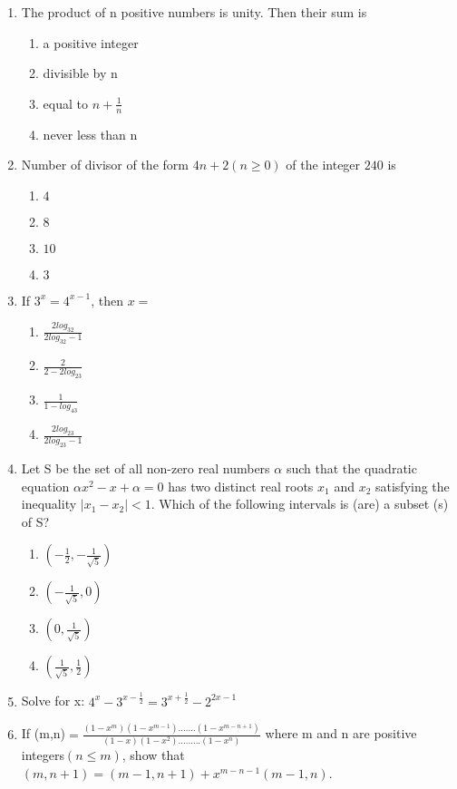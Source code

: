 \documentclass[journal,12pt,twocolumn]{IEEEtran}
\begin{document}
\begin{enumerate}[label=\arabic*]
\item The product of n positive numbers is unity. Then their sum is
\begin{enumerate}
\item a positive integer
\item divisible by n
\item equal to $n+\frac{1}{n}$
\item never less than n
\end{enumerate}

\item Number of divisor of the form $4n+2(n\geq0)$ of the integer $240$ is
\begin{enumerate}
\item $4$
\item $8$ 
\item $10$
\item $3$
\end{enumerate}

\item If $3^{x}=4^{x-1}$, then $x=$
\begin{enumerate}
\item $\frac{2log_32}{2log_32-1}$
\item $\frac{2}{2-2log_23}$
\item $\frac{1}{1-log_43}$
\item $\frac{2log_23}{2log_23-1}$
\end{enumerate}

\item Let S be the set of all non-zero real numbers $\alpha$ such that the quadratic equation $\alpha{x}^{2}-x+\alpha=0$ has two distinct real roots $x_1$ and $x_2$ satisfying the inequality $|x_1-x_2|<1$. Which of the following intervals is (are) a subset (s) of S?
\begin{enumerate}
\item $(-\frac{1}{2},-\frac{1}{\sqrt5})$
\item $(-\frac{1}{\sqrt5},0)$
\item $(0,\frac{1}{\sqrt5})$
\item $(\frac{1}{\sqrt5},\frac{1}{2})$
\end{enumerate}

\item Solve for x: $4^x-3^{x-\frac{1}{2}}=3^{x+\frac{1}{2}}-2^{2x-1}$

\item If (m,n)$=\frac{(1-x^m)(1-x^{m-1}).......(1-x^{m-n+1})}{(1-x)(1-x^2).........(1-x^n)}$ where m and n are positive integers$(n\leq{m})$, show that $(m,n+1)=(m-1,n+1)+x^{m-n-1}(m-1,n)$.


\end{enumerate}
\end{document}
